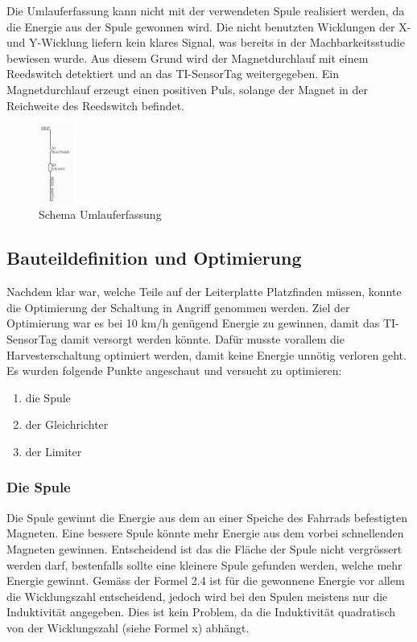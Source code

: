 Die Umlauferfassung kann nicht mit der verwendeten Spule realisiert werden, da die Energie aus der Spule gewonnen wird. Die nicht benutzten Wicklungen der X- und Y-Wicklung liefern kein klares Signal, was bereits in der Machbarkeitsstudie bewiesen wurde. Aus diesem Grund wird der Magnetdurchlauf mit einem Reedswitch detektiert und an das TI-SensorTag weitergegeben. Ein Magnetdurchlauf erzeugt einen positiven Puls, solange der Magnet in der Reichweite des Reedswitch befindet.

\begin{figure}[ht]
    \includegraphics[width=0.1\textwidth]{3Vorgehen/imag/Schema_Umlaufdetektion.png}
    \caption{Schema Umlauferfassung}\label{schema_umlaufdetektion} 
\end{figure}

\newpage
\subsection{Bauteildefinition und Optimierung}

Nachdem klar war, welche Teile auf der Leiterplatte Platzfinden müssen, konnte die Optimierung der Schaltung in Angriff genommen werden. Ziel der Optimierung war es bei 10 km/h genügend Energie zu gewinnen, damit das TI-SensorTag damit versorgt werden könnte. Dafür musste vorallem die Harvesterschaltung optimiert werden, damit keine Energie unnötig verloren geht. 
Es wurden folgende Punkte angeschaut und versucht zu optimieren:

\begin{enumerate}
    \item die Spule
    \item der Gleichrichter
    \item der Limiter
\end{enumerate}

\subsubsection{Die Spule}

Die Spule gewinnt die Energie aus dem an einer Speiche des Fahrrads befestigten Magneten. Eine bessere Spule könnte mehr Energie aus dem vorbei schnellenden Magneten gewinnen. Entscheidend ist das die Fläche der Spule nicht vergrössert werden darf, bestenfalls sollte eine kleinere Spule gefunden werden, welche mehr Energie gewinnt. Gemäss der Formel 2.4 ist für die gewonnene Energie vor allem die Wicklungszahl entscheidend, jedoch wird bei den Spulen meistens nur die Induktivität angegeben. Dies ist kein Problem, da die Induktivität quadratisch von der Wicklungszahl (siehe Formel x) abhängt.

